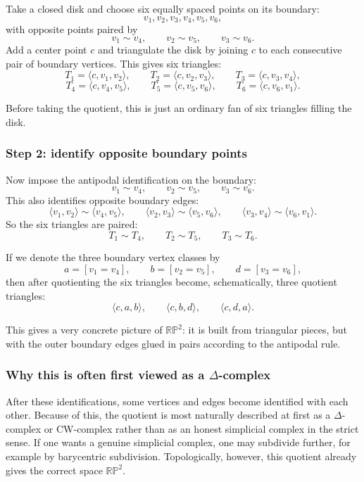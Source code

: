 \documentclass[12pt,a4paper]{article}
\theoremstyle{notespace}
\begin{document}
Take a closed disk and choose six equally spaced points on its boundary:
\[
v_1,v_2,v_3,v_4,v_5,v_6,
\]
with opposite points paired by
\[
v_1\sim v_4,\qquad
v_2\sim v_5,\qquad
v_3\sim v_6.
\]
Add a center point \(c\) and triangulate the disk by joining \(c\) to each consecutive pair of boundary vertices. This gives six triangles:
\[
T_1=\langle c,v_1,v_2\rangle,\qquad
T_2=\langle c,v_2,v_3\rangle,\qquad
T_3=\langle c,v_3,v_4\rangle,
\]
\[
T_4=\langle c,v_4,v_5\rangle,\qquad
T_5=\langle c,v_5,v_6\rangle,\qquad
T_6=\langle c,v_6,v_1\rangle.
\]

Before taking the quotient, this is just an ordinary fan of six triangles filling the disk.

\subsubsection*{Step 2: identify opposite boundary points}

Now impose the antipodal identification on the boundary:
\[
v_1\sim v_4,\qquad
v_2\sim v_5,\qquad
v_3\sim v_6.
\]
This also identifies opposite boundary edges:
\[
\langle v_1,v_2\rangle \sim \langle v_4,v_5\rangle,
\qquad
\langle v_2,v_3\rangle \sim \langle v_5,v_6\rangle,
\qquad
\langle v_3,v_4\rangle \sim \langle v_6,v_1\rangle.
\]
So the six triangles are paired:
\[
T_1\sim T_4,\qquad
T_2\sim T_5,\qquad
T_3\sim T_6.
\]

If we denote the three boundary vertex classes by
\[
a=[v_1=v_4],\qquad
b=[v_2=v_5],\qquad
d=[v_3=v_6],
\]
then after quotienting the six triangles become, schematically, three quotient triangles:
\[
\langle c,a,b\rangle,\qquad
\langle c,b,d\rangle,\qquad
\langle c,d,a\rangle.
\]

This gives a very concrete picture of \(\mathbb{RP}^2\): it is built from triangular pieces, but with the outer boundary edges glued in pairs according to the antipodal rule.

\subsubsection*{Why this is often first viewed as a \(\Delta\)-complex}

After these identifications, some vertices and edges become identified with each other. Because of this, the quotient is most naturally described at first as a \(\Delta\)-complex or CW-complex rather than as an honest simplicial complex in the strict sense. If one wants a genuine simplicial complex, one may subdivide further, for example by barycentric subdivision. Topologically, however, this quotient already gives the correct space \(\mathbb{RP}^2\).
\end{document}
